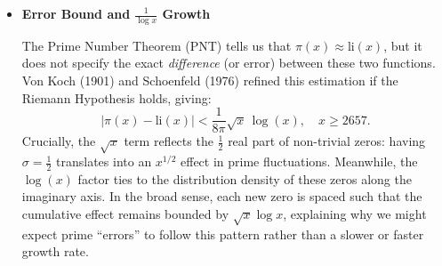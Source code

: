 \documentclass{article}
\begin{document}
\begin{itemize}
    \item \textbf{Error Bound and $\frac{1}{\log x}$ Growth}
    \par
    The Prime Number Theorem (PNT) tells us that
     \(\pi(x)\approx \text{li}(x)\), but it does not specify the exact \textit{difference} 
     (or error) between these two functions. Von Koch (1901) and Schoenfeld (1976) 
     refined this estimation if the Riemann Hypothesis holds, giving:
    \[
    |\pi(x) - \text{li}(x)| < \frac{1}{8\pi} \sqrt{x} \,\log(x), \quad x \ge 2657.
    \]
    Crucially, the \(\sqrt{x}\) term reflects the \(\tfrac12\) real
     part of non-trivial zeros: having \(\sigma = \tfrac12\) 
     translates into an \(x^{1/2}\) effect in prime fluctuations. 
     Meanwhile, the \(\log(x)\) factor ties to the distribution 
     density of these zeros along the imaginary axis. In the broad sense,
     each new zero is spaced such that the cumulative effect remains bounded
     by \(\sqrt{x}\log x\), explaining why we might expect prime “errors” to 
     follow this pattern rather than a slower or faster growth rate.
\end{itemize}

\begin{center}
\end{center}
\end{document}
